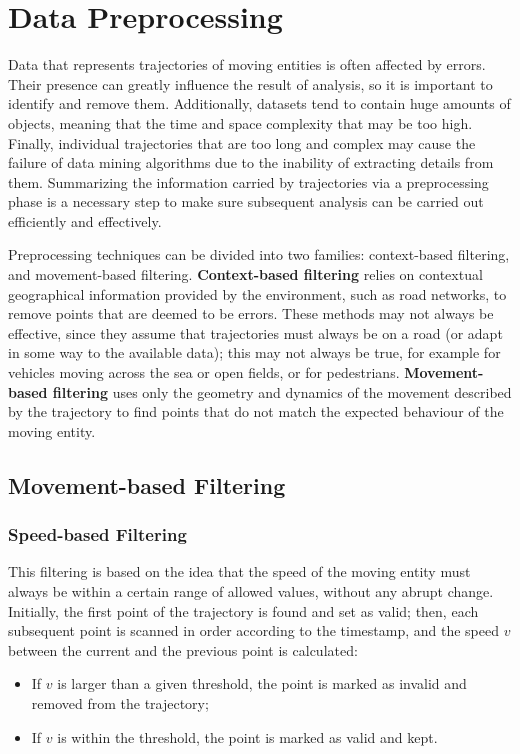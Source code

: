 \chapter{Data Preprocessing}

Data that represents trajectories of moving entities is often affected by errors. Their presence can greatly influence the result of analysis, so it is important to identify and remove them. Additionally, datasets tend to contain huge amounts of objects, meaning that the time and space complexity that may be too high. Finally, individual trajectories that are too long and complex may cause the failure of data mining algorithms due to the inability of extracting details from them. Summarizing the information carried by trajectories via a preprocessing phase is a necessary step to make sure subsequent analysis can be carried out efficiently and effectively.

Preprocessing techniques can be divided into two families: context-based filtering, and movement-based filtering. \textbf{Context-based filtering} relies on contextual geographical information provided by the environment, such as road networks, to remove points that are deemed to be errors. These methods may not always be effective, since they assume that trajectories must always be on a road (or adapt in some way to the available data); this may not always be true, for example for vehicles moving across the sea or open fields, or for pedestrians. \textbf{Movement-based filtering} uses only the geometry and dynamics of the movement described by the trajectory to find points that do not match the expected behaviour of the moving entity.

\section{Movement-based Filtering}

\subsection{Speed-based Filtering}

This filtering is based on the idea that the speed of the moving entity must always be within a certain range of allowed values, without any abrupt change. Initially, the first point of the trajectory is found and set as valid; then, each subsequent point is scanned in order according to the timestamp, and the speed $v$ between the current and the previous point is calculated:
\begin{itemize}
    \item If $v$ is larger than a given threshold, the point is marked as invalid and removed from the trajectory;
    \item If $v$ is within the threshold, the point is marked as valid and kept.
\end{itemize}

